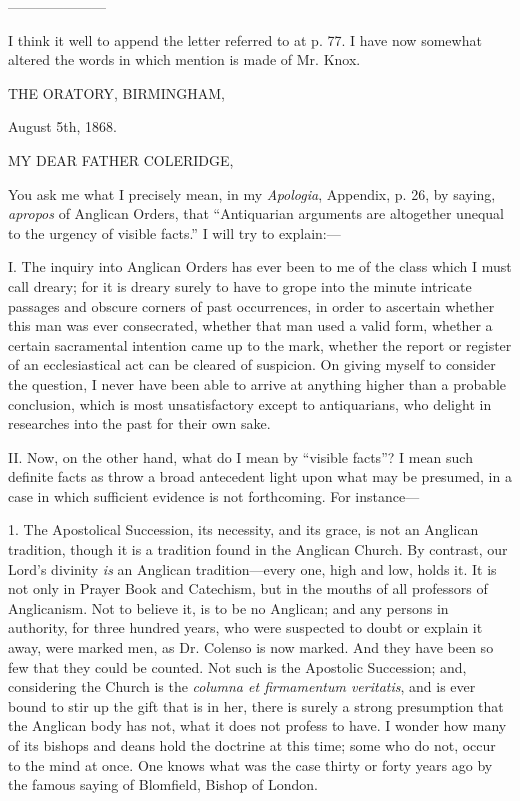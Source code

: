 ———————

I think it well to append the letter referred to at p. 77. I have
now somewhat altered the words in which mention is made of Mr. Knox.

THE ORATORY, BIRMINGHAM,

August 5th, 1868.

MY DEAR FATHER
COLERIDGE,

You ask me what I precisely mean, in my \emph{Apologia}, Appendix, p.
26, by saying, \emph{apropos} of Anglican Orders, that
``Antiquarian arguments are altogether unequal to the urgency of
visible facts.'' I will try to explain:—

I. The inquiry into Anglican Orders has ever been to me of the
class which I must call dreary; for it is dreary surely to have to
grope into the minute intricate passages and obscure corners of past
occurrences, in order to ascertain whether this man was ever
consecrated, whether that man used a valid form, whether a certain
sacramental intention came up to the mark, whether the report or
register of an ecclesiastical act can be cleared of suspicion. On
giving myself to consider the question, I never have been able to
arrive at anything higher than a probable conclusion, which is most
unsatisfactory except to antiquarians, who delight in researches into
the past for their own sake.

II. Now, on the other hand, what do I mean by ``visible
facts''? I mean such definite facts as throw a broad antecedent
light upon what may be presumed, in a case in which sufficient
evidence is not forthcoming. For instance—

1. The Apostolical Succession, its necessity, and its grace, is not an Anglican tradition, though it is a tradition found in the
Anglican Church. By contrast, our Lord's divinity \emph{is} an
Anglican tradition—every one, high and low, holds it. It is not only
in Prayer Book and Catechism, but in the mouths of all professors of
Anglicanism. Not to believe it, is to be no Anglican; and any persons
in authority, for three hundred years, who were suspected to doubt or
explain it away, were marked men, as Dr. Colenso is now marked. And
they have been so few that they could be counted. Not such is the
Apostolic Succession; and, considering the Church is the \emph{columna et
firmamentum veritatis}, and is ever bound to stir up the gift that
is in her, there is surely a strong presumption that the Anglican body
has not, what it does not profess to have. I wonder how many of its
bishops and deans hold the doctrine at this time; some who do not,
occur to the mind at once. One knows what was the case thirty or forty
years ago by the famous saying of Blomfield, Bishop of London.

